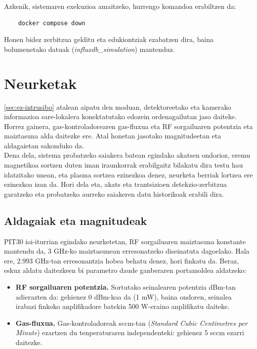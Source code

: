 \documentclass[12pt]{article}
\numberwithin{figure}{section}
\numberwithin{equation}{section}
\begin{document}
Azkenik, sistemaren exekuzioa amaitzeko, hurrengo komandoa erabiltzen da:

\begin{Verbatim}
    docker compose down
\end{Verbatim}

Honen bidez zerbitzua gelditu eta edukiontziak ezabatzen dira, baina bolumenetako datuak (\textit{influxdb\_simulation}) mantenduz.
\newpage
\section{Neurketak}
\ref{sec:ez-intrusibo} atalean aipatu den moduan, detektoreetako eta kamerako informazioa sare-lokalera konektatutako edozein ordenagailutan jaso daiteke. Horrez gainera, gas-kontroladorearen gas-fluxua eta RF sorgailuaren potentzia eta maiztasuna alda daitezke ere. Atal honetan jasotako magnitudeetan eta aldagaietan sakonduko da.\\

Dena dela, sistema probatzeko saiakera batean egindako akatsen ondorioz, eremu magnetikoa sortzen duten iman iraunkorrak erabilgaitz bilakatu dira testu hau idatzitako unean, eta plasma sortzea ezinezkoa denez, neurketa berriak lortzea ere ezinezkoa izan da. Hori dela eta, akats eta trantsizioen detekzio-zerbitzua garatzeko eta probatzeko aurreko saiakeren datu historikoak erabili dira.

\subsection{Aldagaiak eta magnitudeak}

PIT30 ioi-iturrian egindako neurketetan, RF sorgailuaren maiztasuna konstante mantendu da, 3 GHz-ko maiztasunean erresonatzeko diseinatuta dagoelako. Hala ere, 2.993 GHz-tan erresonantzia hobea behatu denez, hori finkatu da. Beraz, eskuz aldatu daitezkeen bi parametro daude ganberaren portamoldea aldatzeko:

\begin{itemize}
    \item \textbf{RF sorgailuaren potentzia.} Sortutako seinalearen potentzia dBm-tan adierazten da: gehienez 0 dBm-koa da (1 mW), baina ondoren, seinalea irabazi finkoko anplifikadore batekin 500 W-eraino anplifikatu daiteke.
    \item \textbf{Gas-fluxua.} Gas-kontroladoreak sccm-tan (\textit{Standard Cubic Centimetres per Minute})
    ezartzen du tenperaturaren independenteki: gehienez 5 sccm ezarri daitezke.
\end{itemize}
\end{document}
